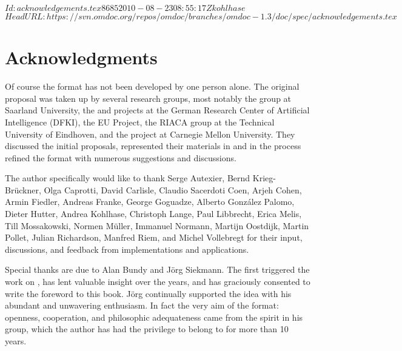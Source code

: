 \svnInfo $Id: acknowledgements.tex 8685 2010-08-23 08:55:17Z kohlhase $
\svnKeyword $HeadURL: https://svn.omdoc.org/repos/omdoc/branches/omdoc-1.3/doc/spec/acknowledgements.tex $

\chapter*{Acknowledgments}
 \thispagestyle{empty}
Of course the {\omdoc} format has not been developed by one person
alone. The original proposal was taken up by several research
groups, most notably the {\OMEGA} group at Saarland University, the
{\maya} and {\activemath} projects at the German Research Center of
Artificial Intelligence (DFKI), the {} EU Project, the
RIACA group at the Technical University of Eindhoven, and the
{} project at Carnegie Mellon University.  They
discussed the initial proposals, represented their materials in
{\omdoc} and in the process refined the format with numerous
suggestions and discussions.

The author specifically would like to thank Serge Autexier, Bernd Krieg-Br\"uckner, Olga
Caprotti, David Carlisle, Claudio Sacerdoti Coen, Arjeh Cohen, Armin Fiedler, Andreas
Franke, George Goguadze, Alberto Gonz\'alez Palomo, Dieter Hutter, Andrea Kohlhase,
Christoph Lange, Paul Libbrecht, Erica Melis, Till Mossakowski, Normen M\"uller, Immanuel
Normann, Martijn Oostdijk, Martin Pollet, Julian Richardson, Manfred Riem, and Michel
Vollebregt for their input, discussions, and feedback from implementations and
applications.

Special thanks are due to Alan Bundy and J\"org Siekmann. The first
triggered the work on {\omdoc}, has lent valuable insight over the
years, and has graciously consented to write the foreword to this
book. J\"org continually supported the {\omdoc} idea with his
abundant and unwavering enthusiasm. In fact the very aim of the
{\omdoc} format: openness, cooperation, and philosophic adequateness
came from the spirit in his {\OMEGA} group, which the author has had
the privilege to belong to for more than 10 years.

